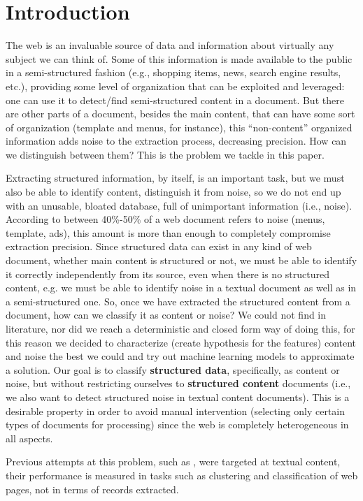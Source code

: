 \section{Introduction}
The web is an invaluable source of data and information about virtually any
subject we can think of. Some of this information is made available to the
public in a semi-structured fashion (e.g., shopping items, news, search engine
results, etc.), providing some level of organization that can be exploited and
leveraged: one can use it to detect/find semi-structured content in a document.
But there are other parts of a document, besides the main content, that can have
some sort of organization (template and menus, for instance), this
``non-content'' organized information adds noise to the extraction process,
decreasing precision. How can we distinguish between them? This is the problem
we tackle in this paper.

Extracting structured information, by itself, is an important task, but we must
also be able to identify content, distinguish it from noise, so we do not end up
with an unusable, bloated database, full of unimportant information (i.e.,
noise).
According to \cite{Volume05,TPS2013} between 40\%-50\% of a web document refers
to noise (menus, template, ads), this amount is more than enough to completely
compromise extraction precision.
Since structured data can exist in any kind of web document, whether main
content is structured or not, we must be able to identify it correctly
independently from its source, even when there is no structured content, e.g. we
must be able to identify noise in a textual document as well as in a
semi-structured one.
So, once we have extracted the structured content from a document, how can we
classify it as content or noise? We could not find in literature, nor did we
reach a deterministic and closed form way of doing this, for this reason we
decided to characterize (create hypothesis for the features) content and noise
the best we could and try out machine learning models to approximate a solution.
Our goal is to classify \textbf{structured data}, specifically, as content or
noise, but without restricting ourselves to \textbf{structured content}
documents (i.e., we also want to detect structured noise in textual content
documents). This is a desirable property in order to avoid manual intervention
(selecting only certain types of documents for processing) since the web is
completely heterogeneous in all aspects.

Previous attempts at this problem, such as \cite{Densiometric08,Noisy03,
Boilerplate10, vieira2006fast}, were targeted at textual content, their
performance is measured in tasks such as clustering and classification of web
pages, not in terms of records extracted.


